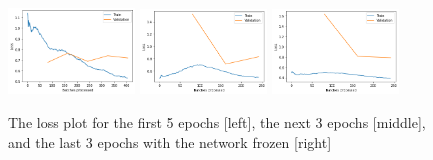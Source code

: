 \documentclass[12pt,letterpaper]{hmcpset}
\begin{document}
\begin{figure}
    \centering
    \includegraphics[width=0.3\textwidth]{loss1}
    \includegraphics[width=0.3\textwidth]{loss2}
    \includegraphics[width=0.3\textwidth]{loss3}
    \caption{The loss plot for the first 5 epochs [left], the next 3 epochs [middle], and the last 3 epochs with the network frozen [right]}
\end{figure}
\end{document}
